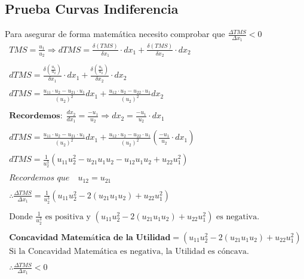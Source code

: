 \documentclass{article}
\begin{document}
\subsection{Prueba Curvas Indiferencia}
Para asegurar de forma matemática necesito comprobar que $\frac{\Delta TMS}{\Delta x_1}<0$
\begin{align*}
    TMS=\frac{u_1}{u_2}\Rightarrow dTMS=\frac{\delta(TMS)}{\delta x_1}\cdot dx_1 + \frac{\delta(TMS)}{\delta x_2}\cdot dx_2\\\\
    dTMS=\frac{\delta(\frac{u_1}{u_2})}{\delta x_1}\cdot dx_1 + \frac{\delta(\frac{u_1}{u_2})}{\delta x_2}\cdot dx_2\\\\
    dTMS=\frac{u_{11}\cdot u_2-u_{21}\cdot u_1}{(u_2)^2}dx_1+\frac{u_{12}\cdot u_2-u_{22}\cdot u_1}{(u_2)^2}dx_2\\\\ 
    \textbf{Recordemos}: \; \frac{dx_2}{dx_1}=\frac{-u_1}{u_2}\Rightarrow dx_2=\frac{-u_1}{u_2}\cdot dx_1\\\\ 
    dTMS=\frac{u_{11}\cdot u_2-u_{21}\cdot u_1}{(u_2)^2}dx_1+\frac{u_{12}\cdot u_2-u_{22}\cdot u_1}{(u_2)^2}(\frac{-u_1}{u_2}\cdot dx_1)\\\\
    dTMS=\frac{1}{u_2^3}(u_{11}u_2^2-u_{21}u_1u_2-u_{12}u_1u_2+u_{22}u_1^2)\\\\ \textit{Recordemos que}\quad u_{12}=u_{21}\\\\ 
    \therefore \frac{\Delta TMS}{\Delta x_1}=\frac{1}{u_2^3}(u_{11}u_2^2-2(u_{21}u_1u_2)+u_{22}u_1^2)\\\\ \text{Donde $\frac{1}{u_2^3}$ es positiva y $(u_{11}u_2^2-2(u_{21}u_1u_2)+u_{22}u_1^2)$ es negativa.}\\\\ \textbf{Concavidad Matemática de la Utilidad}=(u_{11}u_2^2-2(u_{21}u_1u_2)+u_{22}u_1^2) \\ \text{Si la Concavidad Matemática es negativa, la Utilidad es cóncava.}\\\\ 
    \therefore \frac{\Delta TMS}{\Delta x_1}<0
\end{align*}
\newpage
\end{document}
